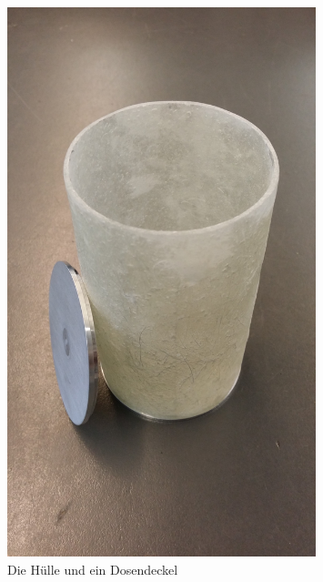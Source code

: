 \begin{figure}[H]
	\centering
	\includegraphics[trim = 11mm 335mm 20mm 210mm, clip, width=0.8\textwidth]{8_Anhang/dose.jpg}
	\caption{Die Hülle und ein Dosendeckel}
	\label{pic_dose}
\end{figure}

